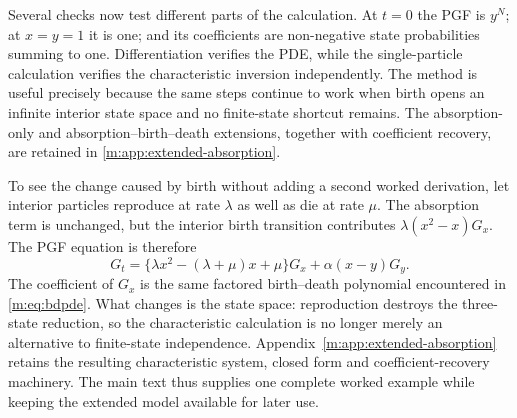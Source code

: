 Several checks now test different parts of the calculation.  At $t=0$ the PGF is
$y^N$; at $x=y=1$ it is one; and its coefficients are non-negative state
probabilities summing to one.  Differentiation verifies the PDE, while the
single-particle calculation verifies the characteristic inversion independently.
The method is useful precisely because the same steps continue to work when birth
opens an infinite interior state space and no finite-state shortcut remains.  The
absorption-only and absorption--birth--death extensions, together with coefficient
recovery, are retained in \cref{m:app:extended-absorption}.

To see the change caused by birth without adding a second worked derivation, let
interior particles reproduce at rate $\lambda$ as well as die at rate $\mu$.
The absorption term is unchanged, but the interior birth transition contributes
$\lambda(x^2-x)G_x$.  The PGF equation is therefore
\begin{equation}
  G_t=\{\lambda x^2-(\lambda+\mu)x+\mu\}G_x
      +\alpha(x-y)G_y.
  \label{m:eq:abd-main-pointer}
\end{equation}
The coefficient of $G_x$ is the same factored birth--death polynomial encountered
in \cref{m:eq:bdpde}.  What changes is the state space: reproduction destroys the
three-state reduction, so the characteristic calculation is no longer merely an
alternative to finite-state independence.  Appendix~\ref{m:app:extended-absorption}
retains the resulting characteristic system, closed form and coefficient-recovery
machinery.  The main text thus supplies one complete worked example while keeping
the extended model available for later use.

\FloatBarrier
